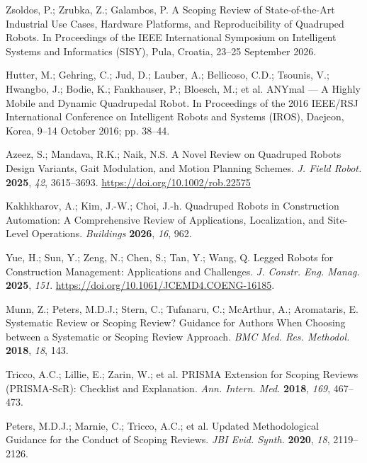 Zsoldos, P.; Zrubka, Z.; Galambos, P. A Scoping Review of
State-of-the-Art Industrial Use Cases, Hardware Platforms, and
Reproducibility of Quadruped Robots. In Proceedings of the IEEE
International Symposium on Intelligent Systems and Informatics (SISY),
Pula, Croatia, 23--25 September 2026.

Hutter, M.; Gehring, C.; Jud, D.; Lauber, A.; Bellicoso, C.D.; Tsounis,
V.; Hwangbo, J.; Bodie, K.; Fankhauser, P.; Bloesch, M.; et al. ANYmal ---
A Highly Mobile and Dynamic Quadrupedal Robot. In Proceedings of the 2016
IEEE/RSJ International Conference on Intelligent Robots and Systems
(IROS), Daejeon, Korea, 9--14 October 2016; pp. 38--44.

Azeez, S.; Mandava, R.K.; Naik, N.S. A Novel Review on Quadruped Robots
Design Variants, Gait Modulation, and Motion Planning Schemes. {\em J.
Field Robot.} {\bf 2025}, {\em 42}, 3615--3693.
\url{https://doi.org/10.1002/rob.22575}

Kakhkharov, A.; Kim, J.-W.; Choi, J.-h. Quadruped Robots in Construction
Automation: A Comprehensive Review of Applications, Localization, and
Site-Level Operations. {\em Buildings} {\bf 2026}, {\em 16}, 962.

Yue, H.; Sun, Y.; Zeng, N.; Chen, S.; Tan, Y.; Wang, Q. Legged Robots for
Construction Management: Applications and Challenges. {\em J. Constr.
Eng. Manag.} {\bf 2025}, {\em 151}.
\url{https://doi.org/10.1061/JCEMD4.COENG-16185}.

Munn, Z.; Peters, M.D.J.; Stern, C.; Tufanaru, C.; McArthur, A.;
Aromataris, E. Systematic Review or Scoping Review? Guidance for Authors
When Choosing between a Systematic or Scoping Review Approach. {\em BMC
Med. Res. Methodol.} {\bf 2018}, {\em 18}, 143.

Tricco, A.C.; Lillie, E.; Zarin, W.; et al. PRISMA Extension for Scoping
Reviews (PRISMA-ScR): Checklist and Explanation. {\em Ann. Intern. Med.}
{\bf 2018}, {\em 169}, 467--473.

Peters, M.D.J.; Marnie, C.; Tricco, A.C.; et al. Updated Methodological
Guidance for the Conduct of Scoping Reviews. {\em JBI Evid. Synth.}
{\bf 2020}, {\em 18}, 2119--2126.

